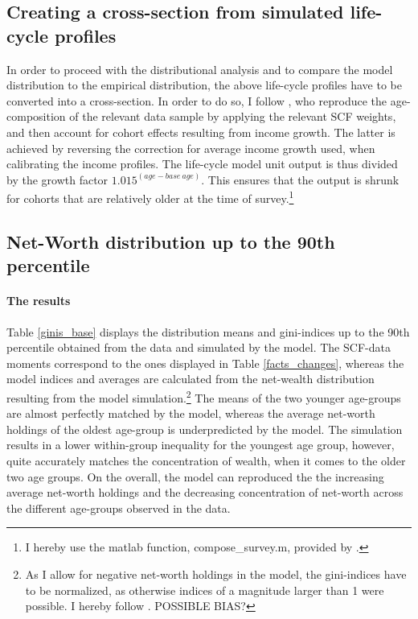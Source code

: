 \documentclass[a4paper,12pt,legno]{article}
\begin{document}
\subsection{Creating a cross-section from simulated life-cycle profiles}
In order to proceed with the distributional analysis and to compare the model distribution to the empirical distribution, the above life-cycle profiles have to be converted into a cross-section. In order to do so, I follow \cite{hintermaier2011}, who reproduce the age-composition of the relevant data sample by applying the relevant SCF weights, and then account for cohort effects resulting from income growth. The latter is achieved by reversing the correction for average income growth used, when calibrating the income profiles. The life-cycle model unit output is thus divided by the growth factor $1.015^{(age-base\ age)}$. This ensures that the output is shrunk for cohorts that are relatively older at the time of survey.\footnote{I hereby use the matlab function, compose\_survey.m, provided by \cite{hintermaier2016}.}

\subsection{Net-Worth distribution up to the 90th percentile}

\paragraph{The results}
Table \ref{ginis_base} displays the distribution means and gini-indices up to the 90th percentile obtained from the data and simulated by the model. The SCF-data moments correspond to the ones displayed in Table \ref{facts_changes}, whereas the model indices and averages are calculated from the net-wealth distribution resulting from the model simulation.\footnote{As I allow for negative net-worth holdings in the model, the gini-indices have to be normalized, as otherwise indices of a magnitude larger than 1 were possible. I hereby follow \cite{chen1982}. POSSIBLE BIAS?} The means of the two younger age-groups are almost perfectly matched by the model, whereas the average net-worth holdings of the oldest age-group is underpredicted by the model. The simulation results in a lower within-group inequality for the youngest age group, however, quite accurately matches the concentration of wealth, when it comes to the older two age groups. On the overall, the model can reproduced the the increasing average net-worth holdings and the decreasing concentration of net-worth across the different age-groups observed in the data. 
\end{document}
